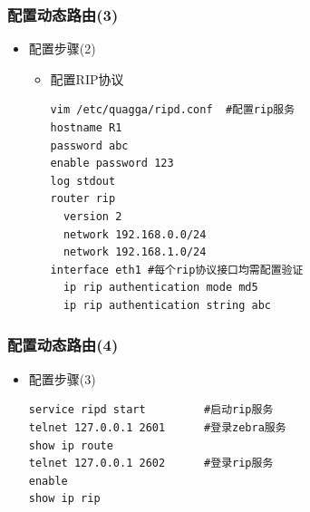 \documentclass[xcolor=svgnames,presentation]{beamer}
\begin{document}
\begin{frame}[fragile]
\frametitle{配置动态路由(3)}
\label{sec-3-7}
\begin{itemize}

\item 配置步骤(2)
\label{sec-3-7-1}%
\begin{itemize}

\item 配置RIP协议\\
\label{sec-3-7-1-1}%
\begin{verbatim}
vim /etc/quagga/ripd.conf  #配置rip服务
hostname R1
password abc
enable password 123
log stdout
router rip
  version 2
  network 192.168.0.0/24
  network 192.168.1.0/24
interface eth1 #每个rip协议接口均需配置验证
  ip rip authentication mode md5
  ip rip authentication string abc
\end{verbatim}
\end{itemize} %
\end{itemize} %
\end{frame}
\begin{frame}[fragile]
\frametitle{配置动态路由(4)}
\label{sec-3-8}
\begin{itemize}

\item 配置步骤(3)\\
\label{sec-3-8-1}%
\begin{verbatim}
service ripd start         #启动rip服务
telnet 127.0.0.1 2601      #登录zebra服务
show ip route
telnet 127.0.0.1 2602      #登录rip服务
enable
show ip rip
\end{verbatim}
\end{itemize} %
\end{frame}
\end{document}
